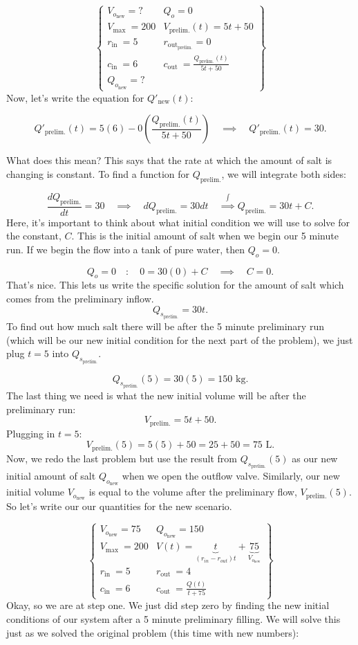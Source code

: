 \documentclass[a4paper,12pt]{article} %
\begin{document}
$$
\left\{
\begin{array}{ll}
V_{o_{\text{new}}}=? & Q_o=0 \\
V_{\text {max }}=200 & V_{\text{prelim.}}(t)=5t+50 \\
r_{\text {in }}=5 & r_{\text {out}_{\text{prelim.}}}=0 \\
c_{\text {in }}=6 & c_{\text {out }}=\frac{Q_{\text{prelim.}}(t)}{5t+50}\\
Q_{o_{\text{new}}}=?
\end{array}
\right\}
$$
Now, let's write the equation for $Q'_{\text{new}}(t)$:

$$ Q'_{\text{prelim.}}(t) = 5(6) - 0\left(\frac{Q_{\text{prelim.}}(t)}{5t + 50}\right) \quad\implies\quad Q'_{\text{prelim.}}(t) = 30 . $$

What does this mean? This says that the rate at which the amount of salt is changing is constant. To find a function for $Q_{\text{prelim.}}$, we will integrate both sides:

$$ \frac{dQ_{\text{prelim.}}}{dt} = 30 \quad\implies\quad dQ_{\text{prelim.}} = 30dt \quad\overset{\int}\implies Q_{\text{prelim.}} = 30t + C. $$
Here, it's important to think about what initial condition we will use to solve for the constant, $C$. This is the initial amount of salt when we begin our 5 minute run. If we begin the flow into a tank of pure water, then $Q_{o}=0$.

$$ Q_o = 0 \quad:\quad 0 = 30 (0) + C \quad\implies\quad C = 0. $$
That's nice. This lets us write the specific solution for the amount of salt which comes from the preliminary inflow.
$$
Q_{s_{\text{prelim.}}} = 30t.
$$
To find out how much salt there will be after the 5 minute preliminary run (which will be our new initial condition for the next part of the problem), we just plug $t=5$ into $Q_{s_{\text{prelim.}}}.$

$$ Q_{s_{\text{prelim.}}}(5) = 30(5) = 150 \text{ kg}. $$
The last thing we need is what the new initial volume will be after the preliminary run:
$$ V_{\text{prelim.}} = 5t + 50. $$
Plugging in $t=5$:
$$ V_{\text{prelim.}}(5) = 5(5) + 50 = 25 + 50 = 75 \text{ L}. $$
Now, we redo the last problem but use the result from $Q_{s_{\text{prelim.}}}(5)$ as our new initial amount of salt $Q_{o_{\text{new}}}$ when we open the outflow valve. Similarly, our new initial volume $V_{o_{\text{new}}}$ is equal to the volume after the preliminary flow, $V_{\text{prelim.}}(5)$. So let's write our our quantities for the new scenario.

$$
\left\{
\begin{array}{ll}
V_{o_{\text{new}}}=75 & Q_{o_{\text{new}}}=150 \\
V_{\text {max }}=200 & V(t)=\underbrace{t}_{(r_{in} - r_{out})t} +\underbrace{75}_{V_{o_{\text{new}}}} \\
r_{\text {in }}=5 & r_{\text {out }}=4 \\
c_{\text {in }}=6 & c_{\text {out }}=\frac{Q(t)}{t+75}
\end{array}
\right\}
$$
Okay, so we are at step one. We just did step zero by finding the new initial conditions of our system after a 5 minute preliminary filling. We will solve this just as we solved the original problem (this time with new numbers):
\end{document}
